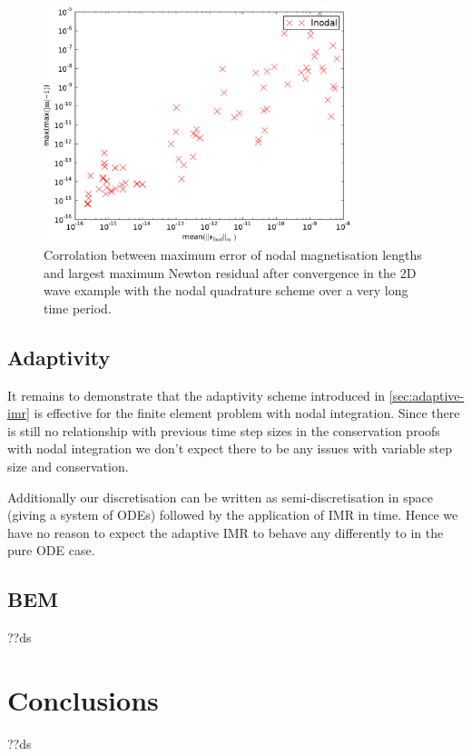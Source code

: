 \begin{figure}[\figpos]
  \centering
  \includegraphics[width=0.8\textwidth]
  {plots/2d_wave_solution_m_length_newton_res/-maxmaxmathbfm-1vsmeanmathbfr_mathrmfinal_infty.pdf}
  \caption{Corrolation between maximum error of nodal magnetisation lengths and largest maximum Newton residual after convergence in the 2D wave example with the nodal quadrature scheme over a very long time period.}
  \label{fig:mean-ml-error-2d-nodal-newton-tests}
\end{figure}


\subsection{Adaptivity}

It remains to demonstrate that the adaptivity scheme introduced in \autoref{sec:adaptive-imr} is effective for the finite element problem with nodal integration.
Since there is still no relationship with previous time step sizes in the conservation proofs with nodal integration we don't expect there to be any issues with variable step size and conservation.

Additionally our discretisation can be written as semi-discretisation in space (giving a system of ODEs) followed by the application of IMR in time.
Hence we have no reason to expect the adaptive IMR to behave any differently to in the pure ODE case.

\subsection{BEM}

??ds


\section{Conclusions}

??ds






